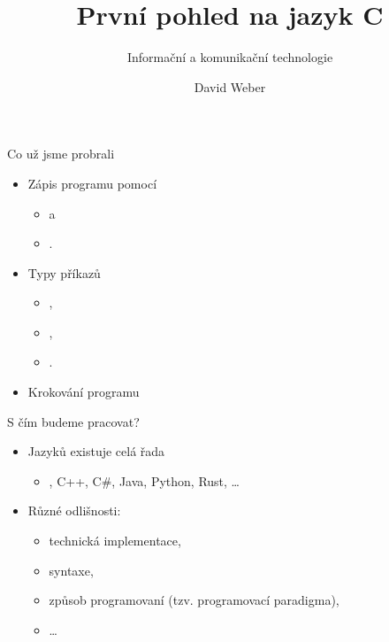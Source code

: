 \documentclass[14pt]{beamer}
\subtitle{Informační a komunikační technologie}
\title{První pohled na jazyk C}
\author{David Weber}
\begin{document}



    \begin{frame}
        \titlepage
    \end{frame}

    \begin{frame}[t]{Co už jsme probrali}
        \begin{itemize}
            \item Zápis programu pomocí
            \begin{itemize}
                \item {} a
                \item {}.
            \end{itemize}
            \item Typy příkazů
            \begin{itemize}
                \item {},
                \item {},
                \item {}.

            \end{itemize}
            \item Krokování programu
        \end{itemize}
        \begin{center}
             
        \end{center}
    \end{frame}

    \begin{frame}[t]{S čím budeme pracovat?}
        \begin{itemize}
            \item Jazyků existuje celá řada
            \begin{itemize}
                \item {}, C++, C\#, Java, Python, Rust, \dots
            \end{itemize}
            \item Různé odlišnosti:
            \begin{itemize}
                \item technická implementace,
                \item syntaxe,
                \item způsob programovaní (tzv. programovací paradigma),
                \item \dots
            \end{itemize}
        \end{itemize}
    \end{frame}
\end{document}
